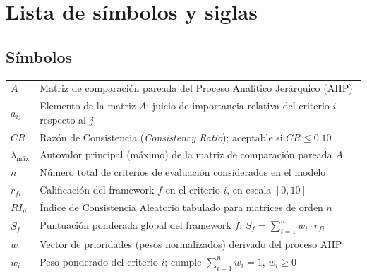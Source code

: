 \chapter*{Lista de símbolos y siglas}

\section*{Símbolos}
\begin{longtable}{@{}p{2.2cm}p{12.5cm}@{}}
$A$ & Matriz de comparación pareada del Proceso Analítico Jerárquico (AHP) \\
$a_{ij}$ & Elemento de la matriz $A$: juicio de importancia relativa del criterio $i$ respecto al $j$ \\
$CR$ & Razón de Consistencia (\emph{Consistency Ratio}); aceptable si $CR \leq 0.10$ \\
$\lambda_{\text{máx}}$ & Autovalor principal (máximo) de la matriz de comparación pareada $A$ \\
$n$ & Número total de criterios de evaluación considerados en el modelo \\
$r_{fi}$ & Calificación del framework $f$ en el criterio $i$, en escala $[0,10]$ \\
$RI_n$ & Índice de Consistencia Aleatorio tabulado para matrices de orden $n$ \\
$S_f$ & Puntuación ponderada global del framework $f$: $S_f = \sum_{i=1}^{n} w_i \cdot r_{fi}$ \\
$w$ & Vector de prioridades (pesos normalizados) derivado del proceso AHP \\
$w_i$ & Peso ponderado del criterio $i$; cumple $\sum_{i=1}^{n} w_i = 1$, $w_i \geq 0$ \\
\end{longtable}

